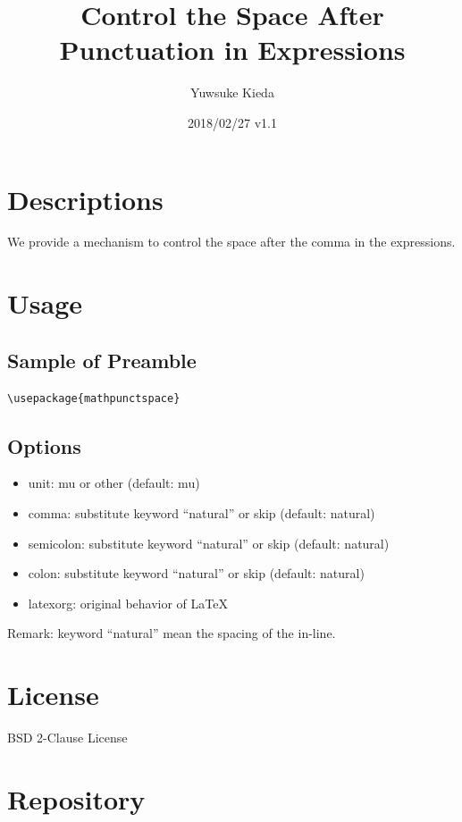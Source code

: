 \documentclass{article}
\title{Control the Space After Punctuation in Expressions}
\author{Yuwsuke Kieda}
\date{2018/02/27 v1.1}
\begin{document}
\maketitle

\section{Descriptions}

We provide a mechanism to control the space after the comma in the expressions.

\section{Usage}

\subsection{Sample of Preamble}

\begin{verbatim}
\usepackage{mathpunctspace}
\end{verbatim}

\subsection{Options}

\begin{itemize}
 \item unit: mu or other (default: mu)
 \item comma: substitute keyword ``natural'' or skip (default: natural)
 \item semicolon: substitute keyword ``natural'' or skip (default: natural)
 \item colon: substitute keyword ``natural'' or skip (default: natural)
 \item latexorg: original behavior of LaTeX
\end{itemize}

Remark: keyword ``natural'' mean the spacing of the in-line.

\section{License}

BSD 2-Clause License

\section{Repository}
\end{document}
